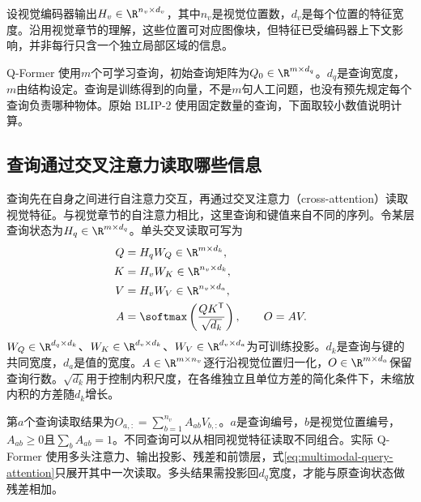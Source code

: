 设视觉编码器输出$H_v\in\R^{n_v\times d_v}$，其中$n_v$是视觉位置数，$d_v$是每个位置的特征宽度。沿用视觉章节的理解，这些位置可对应图像块，但特征已受编码器上下文影响，并非每行只含一个独立局部区域的信息。

Q-Former 使用$m$个可学习查询，初始查询矩阵为$Q_0\in\R^{m\times d_q}$。$d_q$是查询宽度，$m$由结构设定。查询是训练得到的向量，不是$m$句人工问题，也没有预先规定每个查询负责哪种物体。原始 BLIP-2 使用固定数量的查询，下面取较小数值说明计算。

\subsection{查询通过交叉注意力读取哪些信息}
查询先在自身之间进行自注意力交互，再通过交叉注意力（cross-attention）读取视觉特征。与视觉章节的自注意力相比，这里查询和键值来自不同的序列。令某层查询状态为$H_q\in\R^{m\times d_q}$。单头交叉读取可写为
\begin{align}
 Q&=H_qW_Q\in\R^{m\times d_k},\\
 K&=H_vW_K\in\R^{n_v\times d_k},\\
 V&=H_vW_V\in\R^{n_v\times d_a},\\
 A&=\softmax\left(\frac{QK^{\mathsf T}}{\sqrt{d_k}}\right),
 \qquad O=AV.
 \label{eq:multimodal-query-attention}
\end{align}
$W_Q\in\R^{d_q\times d_k}$、$W_K\in\R^{d_v\times d_k}$、$W_V\in\R^{d_v\times d_a}$为可训练投影。$d_k$是查询与键的共同宽度，$d_a$是值的宽度。$A\in\R^{m\times n_v}$逐行沿视觉位置归一化，$O\in\R^{m\times d_a}$保留查询行数。$\sqrt{d_k}$用于控制内积尺度，在各维独立且单位方差的简化条件下，未缩放内积的方差随$d_k$增长。

第$a$个查询读取结果为$O_{a,:}=\sum_{b=1}^{n_v}A_{ab}V_{b,:}$。$a$是查询编号，$b$是视觉位置编号，$A_{ab}\geq0$且$\sum_bA_{ab}=1$。不同查询可以从相同视觉特征读取不同组合。实际 Q-Former 使用多头注意力、输出投影、残差和前馈层，式\eqref{eq:multimodal-query-attention}只展开其中一次读取。多头结果需投影回$d_q$宽度，才能与原查询状态做残差相加。

